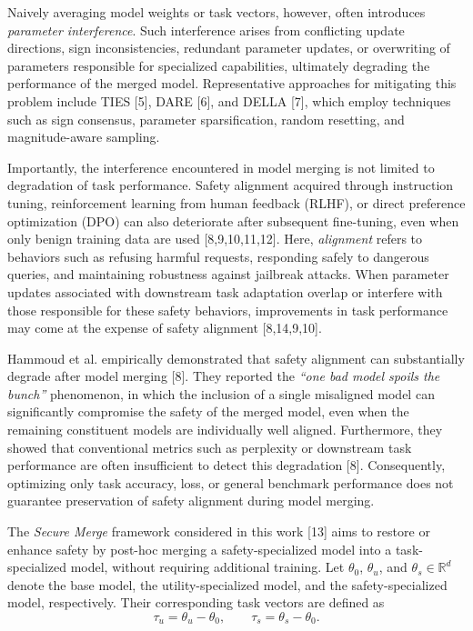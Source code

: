 \documentclass{article}
\begin{document}
Naively averaging model weights or task vectors, however, often introduces \emph{parameter interference}. Such interference arises from conflicting update directions, sign inconsistencies, redundant parameter updates, or overwriting of parameters responsible for specialized capabilities, ultimately degrading the performance of the merged model. Representative approaches for mitigating this problem include TIES [5], DARE [6], and DELLA [7], which employ techniques such as sign consensus, parameter sparsification, random resetting, and magnitude-aware sampling.

Importantly, the interference encountered in model merging is not limited to degradation of task performance. Safety alignment acquired through instruction tuning, reinforcement learning from human feedback (RLHF), or direct preference optimization (DPO) can also deteriorate after subsequent fine-tuning, even when only benign training data are used [8,9,10,11,12]. Here, \emph{alignment} refers to behaviors such as refusing harmful requests, responding safely to dangerous queries, and maintaining robustness against jailbreak attacks. When parameter updates associated with downstream task adaptation overlap or interfere with those responsible for these safety behaviors, improvements in task performance may come at the expense of safety alignment [8,14,9,10].

Hammoud et al. empirically demonstrated that safety alignment can substantially degrade after model merging [8]. They reported the \emph{``one bad model spoils the bunch''} phenomenon, in which the inclusion of a single misaligned model can significantly compromise the safety of the merged model, even when the remaining constituent models are individually well aligned. Furthermore, they showed that conventional metrics such as perplexity or downstream task performance are often insufficient to detect this degradation [8]. Consequently, optimizing only task accuracy, loss, or general benchmark performance does not guarantee preservation of safety alignment during model merging.

The \emph{Secure Merge} framework considered in this work [13] aims to restore or enhance safety by post-hoc merging a safety-specialized model into a task-specialized model, without requiring additional training. Let $\theta_0$, $\theta_u$, and $\theta_s \in \mathbb{R}^d$ denote the base model, the utility-specialized model, and the safety-specialized model, respectively. Their corresponding task vectors are defined as
\[
\tau_u=\theta_u-\theta_0,\qquad
\tau_s=\theta_s-\theta_0.
\]
\end{document}
